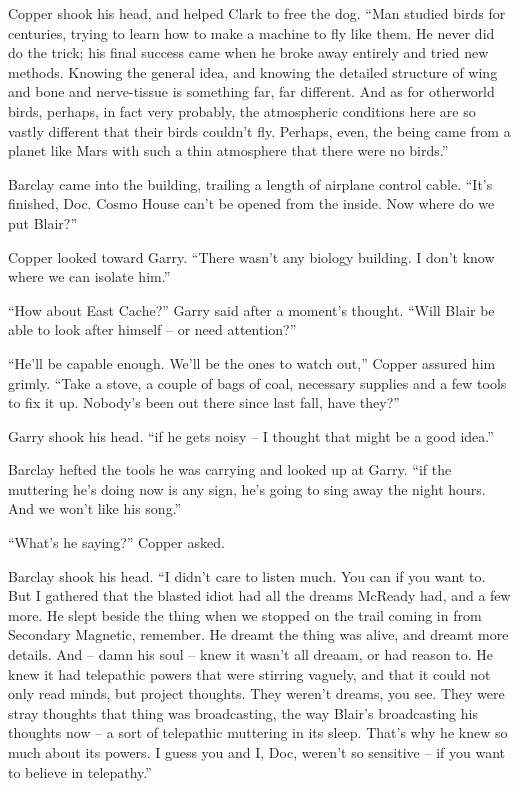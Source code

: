 \documentclass[letterpaper,openany,12pt]{memoir}		%
\begin{document}
Copper shook his head, and helped Clark to free the dog. ``Man studied birds for
centuries, trying to learn how to make a machine to fly like them. He never did
do the trick; his final success came when he broke away entirely and tried new
methods. Knowing the general idea, and knowing the detailed structure of wing
and bone and nerve-tissue is something far, far different. And as for otherworld
birds, perhaps, in fact very probably, the atmospheric conditions here are so
vastly different that their birds couldn't fly. Perhaps, even, the being came
from a planet like Mars with such a thin atmosphere that there were no birds.''

Barclay came into the building, trailing a length of airplane control cable.
``It's finished, Doc. Cosmo House can't be opened from the inside. Now where do
we put Blair?''

Copper looked toward Garry. ``There wasn't any biology building. I don't know
where we can isolate him.''

``How about East Cache?'' Garry said after a moment's thought. ``Will Blair be
able to look after himself -- or need attention?''

``He'll be capable enough. We'll be the ones to watch out,'' Copper assured him
grimly. ``Take a stove, a couple of bags of coal, necessary supplies and a few
tools to fix it up. Nobody's been out there since last fall, have they?''

Garry shook his head. ``if he gets noisy -- I thought that might be a good
idea.''

Barclay hefted the tools he was carrying and looked up at Garry. ``if the
muttering he's doing now is any sign, he's going to sing away the night hours.
And we won't like his song.''

``What's he saying?'' Copper asked.

Barclay shook his head. ``I didn't care to listen much. You can if you want to.
But I gathered that the blasted idiot had all the dreams McReady had, and a few
more. He slept beside the thing when we stopped on the trail coming in from
Secondary Magnetic, remember. He dreamt the thing was alive, and dreamt more
details. And -- damn his soul -- knew it wasn't all dreaam, or had reason to. He
knew it had telepathic powers that were stirring vaguely, and that it could not
only read minds, but project thoughts. They weren't dreams, you see. They were
stray thoughts that thing was broadcasting, the way Blair's broadcasting his
thoughts now -- a sort of telepathic muttering in its sleep. That's why he knew
so much about its powers. I guess you and I, Doc, weren't so sensitive -- if you
want to believe in telepathy.''
\end{document}
